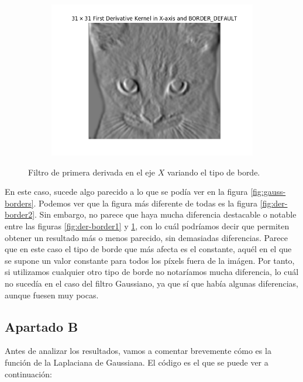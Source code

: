 \documentclass[11pt,a4paper]{article}
\begin{document}
\begin{figure}[H]
\begin{subfigure}{\textwidth}
	\includegraphics[scale=0.44]{img/der-border3.png}
	\label{fig:der-border3}
\end{subfigure}
\caption{Filtro de primera derivada en el eje $X$ variando el tipo de borde.}
\label{fig:der-border}
\end{figure}

En este caso, sucede algo parecido a lo que se podía ver en la figura \ref{fig:gauss-borders}. Podemos ver que
la figura más diferente de todas es la figura \ref{fig:der-border2}. Sin embargo, no parece que haya mucha diferencia
destacable o notable entre las figuras \ref{fig:der-border1} y \ref{fig:der-border3}, con lo cuál podríamos decir que
permiten obtener un resultado más o menos parecido, sin demasiadas diferencias. Parece que en este caso el tipo
de borde que más afecta es el constante, aquél en el que se supone un valor constante para todos los píxels fuera de la imágen.
Por tanto, si utilizamos cualquier otro tipo de borde no notaríamos mucha diferencia, lo cuál no sucedía en el caso del
filtro Gaussiano, ya que sí que había algunas diferencias, aunque fuesen muy pocas.

\subsection{Apartado B}

Antes de analizar los resultados, vamos a comentar brevemente cómo es la función de la Laplaciana de Gaussiana. El código
es el que se puede ver a continuación:
\end{document}
